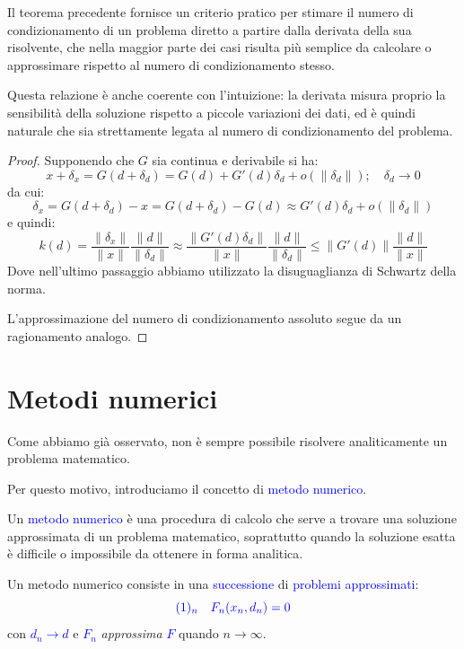 \begin{obs}
Il teorema precedente fornisce un criterio pratico per stimare il numero di condizionamento di un problema diretto a partire dalla derivata della sua risolvente, che nella maggior parte dei casi risulta più semplice da calcolare o approssimare rispetto al numero di condizionamento stesso.

Questa relazione è anche coerente con l'intuizione: la derivata misura proprio la sensibilità della soluzione rispetto a piccole variazioni dei dati, ed è quindi naturale che sia strettamente legata al numero di condizionamento del problema.
\end{obs}

\begin{proof}
    Supponendo che $G$ sia continua e derivabile si ha:
    \[
    x+\delta_x = G(d+\delta_d) = G(d) + G'(d)\delta_d + o(\|\delta_d\|); \quad \delta_d \to 0
    \]
    da cui:
    \[\delta_x = G(d+\delta_d) - x = G(d+\delta_d) - G(d) \approx G'(d)\delta_d + o(\|\delta_d\|)\]
    e quindi:
    \[
    k(d) = \frac{\|\delta_x\|}{\|x\|} \frac{\|d\|}{\|\delta_d\|} \approx \frac{\|G'(d)\delta_d\|}{\|x\|}\frac{\|d\|}{\|\delta_d\|} \leq \|G'(d)\| \frac{\|d\|}{\|x\|}
    \]
    Dove nell'ultimo passaggio abbiamo utilizzato la disuguaglianza di Schwartz della norma.

    L'approssimazione del numero di condizionamento assoluto segue da un ragionamento analogo.  
\end{proof}

\section{Metodi numerici}
Come abbiamo già osservato, non è sempre possibile risolvere analiticamente un problema matematico.

Per questo motivo, introduciamo il concetto di \textcolor{blue}{metodo numerico}.

\begin{defi}
    Un \textcolor{blue}{metodo numerico} è una procedura di calcolo che serve a trovare una soluzione approssimata di un problema matematico,
    soprattutto quando la soluzione esatta è difficile o impossibile da ottenere in forma analitica.

    Un metodo numerico consiste in una \textcolor{blue}{successione} di \textcolor{blue}{problemi approssimati}:
    \[
        \textcolor{blue}{(1)_n \quad F_n(x_n, d_n) = 0}
    \]
    con \textcolor{blue}{$d_n \to d$} e \textcolor{blue}{$F_n$} \textit{approssima} \textcolor{blue}{$F$} quando $n \to \infty$.
\end{defi}

